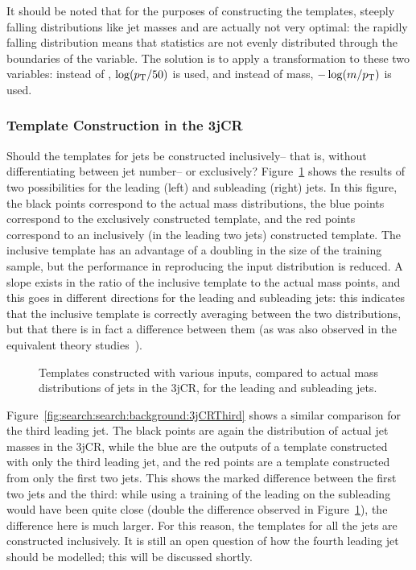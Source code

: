 It should be noted that for the purposes of constructing the templates, steeply falling distributions like jet masses and \pt are actually not very optimal: the rapidly falling distribution means that statistics are not evenly distributed through the boundaries of the variable. The solution is to apply a transformation to these two variables: instead of \pt, $\log(p_{\text{T}}/50)$ is used, and instead of mass, $-\log(m/p_{\text{T}})$ is used.

\subsubsection{Template Construction in the 3jCR}

Should the templates for jets be constructed inclusively-- that is, without differentiating between jet number-- or exclusively? Figure~\ref{fig:search:search:background:3jCR} shows the results of two possibilities for the leading (left) and subleading (right) jets.  In this figure, the black points correspond to the actual mass distributions, the blue points correspond to the exclusively constructed template, and the red points correspond to an inclusively (in the leading two jets) constructed template. The inclusive template has an advantage of a doubling in the size of the training sample, but the performance in reproducing the input distribution is reduced. A slope exists in the ratio of the inclusive template to the actual mass points, and this goes in different directions for the leading and subleading jets: this indicates that the inclusive template is correctly averaging between the two distributions, but that there is in fact a difference between them (as was also observed in the equivalent theory studies~\cite{MassTemplates}).


\begin{figure}[!ht]
  \centering
    \caption{Templates constructed with various inputs, compared to actual mass distributions of jets in the 3jCR, for the leading and subleading jets.}
  \label{fig:search:search:background:3jCR}
\end{figure}

Figure~\ref{fig:search:search:background:3jCRThird} shows a similar comparison for the third leading jet. The black points are again the distribution of actual jet masses in the 3jCR, while the blue are the outputs of a template constructed with only the third leading jet, and the red points are a template constructed from only the first two jets. This shows the marked difference between the first two jets and the third: while using a training of the leading on the subleading would have been quite close (double the difference observed in Figure~\ref{fig:search:search:background:3jCR}), the difference here is much larger. For this reason, the templates for all the jets are constructed inclusively. It is still an open question of how the fourth leading jet should be modelled; this will be discussed shortly.

